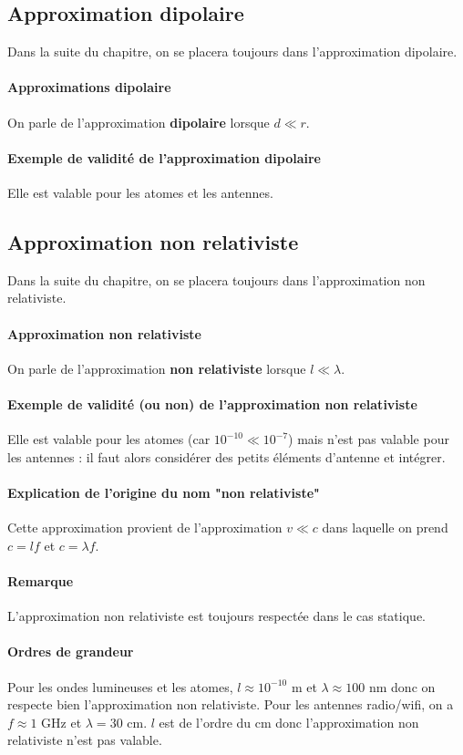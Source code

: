 \documentclass[french]{book}
\theoremstyle{plain}
\theoremstyle{definition}
\theoremstyle{remark}
\begin{document}
\subsection{Approximation dipolaire}
Dans la suite du chapitre, on se placera toujours dans l'approximation dipolaire.
\paragraph{Approximations dipolaire} On parle de l'approximation \textbf{dipolaire} lorsque $d\ll r$.
\paragraph{Exemple de validité de l'approximation dipolaire}Elle est valable pour les atomes et les antennes.
\subsection{Approximation non relativiste}
Dans la suite du chapitre, on se placera toujours dans l'approximation non relativiste.
\paragraph{Approximation non relativiste} On parle de l'approximation \textbf{non relativiste} lorsque $l\ll\lambda$.
\paragraph{Exemple de validité (ou non) de l'approximation non relativiste}Elle est valable pour les atomes (car $10^{-10}\ll 10^{-7}$) mais n'est pas valable pour les antennes : il faut alors considérer des petits éléments d'antenne et intégrer.
\paragraph{Explication de l'origine du nom "non relativiste"}Cette approximation provient de l'approximation $v\ll c$ dans laquelle on prend $c=lf$ et $c=\lambda f$.
\paragraph{Remarque} L'approximation non relativiste est toujours respectée dans le cas statique.
\paragraph{Ordres de grandeur} Pour les ondes lumineuses et les atomes, $l\approx10^{-10}$ m et $\lambda\approx100$ nm donc on respecte bien l'approximation non relativiste. Pour les antennes radio/wifi, on a $f\approx1$ GHz et $\lambda=30$ cm. $l$ est de l'ordre du cm donc l'approximation non relativiste n'est pas valable.
\end{document}
